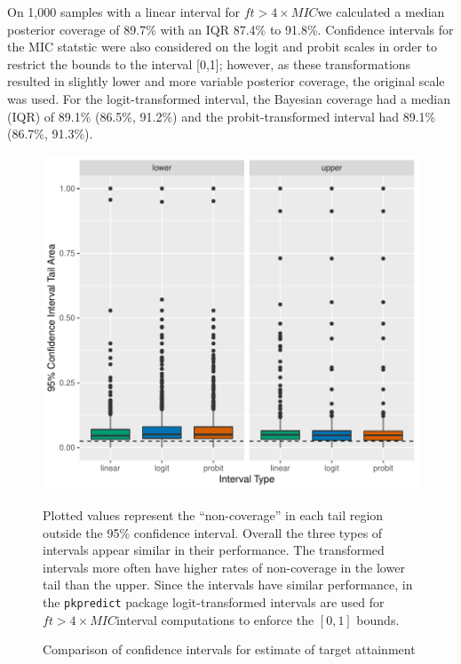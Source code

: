 \documentclass{article}\usepackage[]{graphicx}\usepackage[]{color}
\newcommand{\mic}{$ft > 4 \times MIC$}
\begin{document}
On 1,000 samples with a linear interval for \mic we calculated a median posterior coverage of 89.7\% with an IQR 87.4\% to 91.8\%. Confidence intervals for the MIC statstic were also considered on the logit and probit scales in order to restrict the bounds to the interval [0,1]; however, as these transformations resulted in slightly lower and more variable posterior coverage, the original scale was used. For the logit-transformed interval, the Bayesian coverage had a median (IQR) of 89.1\% (86.5\%, 91.2\%) and the probit-transformed interval had 89.1\% (86.7\%, 91.3\%).








\begin{figure}
\caption{Comparison of confidence intervals for estimate of target attainment}

\includegraphics{intervalcomparison.pdf}

\footnotesize
Plotted values represent the ``non-coverage'' in each tail region outside the 95\% confidence interval. Overall the three types of intervals appear similar in their performance. The transformed intervals more often have higher rates of non-coverage in the lower tail than the upper. Since the intervals have similar performance, in the \texttt{pkpredict} package logit-transformed intervals are used for \mic interval computations to enforce the $[0,1]$ bounds.
\end{figure}
\end{document}
